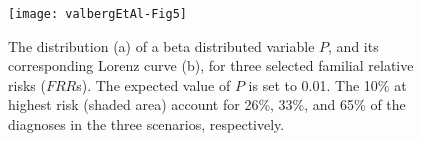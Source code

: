 \documentclass{bmcart}
\begin{document}
\begin{backmatter}
\begin{landscape}
\begin{figure}[]
 	\centering
	\texttt{[image: valbergEtAl-Fig5]}
 	\caption{The distribution (a) of a beta distributed variable $P$, and its corresponding Lorenz curve (b), for three selected familial relative risks ($FRR$s). The expected value of $P$ is set to 0.01. The 10\% at highest risk (shaded area) account for 26\%, 33\%, and 65\% of the diagnoses in the three scenarios, respectively.}
 	 \label{lorenz3eks}
\end{figure}
\end{landscape}





\end{backmatter}
\end{document}
